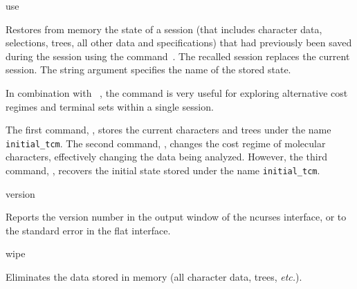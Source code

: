 \begin{command}{use}{}

	\syntax{\obligatory{(\poystring)}}

	\begin{poydescription}
         Restores from memory the state of a \poy session (that includes character data,
         selections, trees, all other data and specifications) that had previously been
         saved during the session using the command~. The recalled
         session replaces the current session. The string argument specifies the name
         of the stored state.
         
         In combination with ~, the command 
         is very useful for exploring alternative  cost regimes and terminal sets
         within a single \poy session.
            
	\end{poydescription}
	
	\begin{poyexamples}
            {The first command, , stores the current
            characters and trees under the
            name \texttt{initial\_tcm}. The second command,
            , changes the cost regime of molecular characters,
            effectively changing the data being analyzed. However, the third
            command, , recovers the initial state stored under the
            name \texttt{initial\_tcm}.}
    \end{poyexamples}

     \begin{poyalso}
    \end{poyalso}

\end{command}

\begin{command}{version}{}

	\syntax{\obligatory{()}}

	\begin{poydescription}
            Reports the \poy version number in the output window of the ncurses
            interface, or to the standard error in the flat interface.
	\end{poydescription}

    \begin{poyexamples}
    \end{poyexamples}
\end{command}

\begin{command}{wipe}{}

	\syntax{\obligatory{()}}

	\begin{poydescription}
        Eliminates the data stored in memory (all character data, trees, \emph{etc.}).
	\end{poydescription}

    \begin{poyexamples}
    \end{poyexamples}
\end{command}
      
